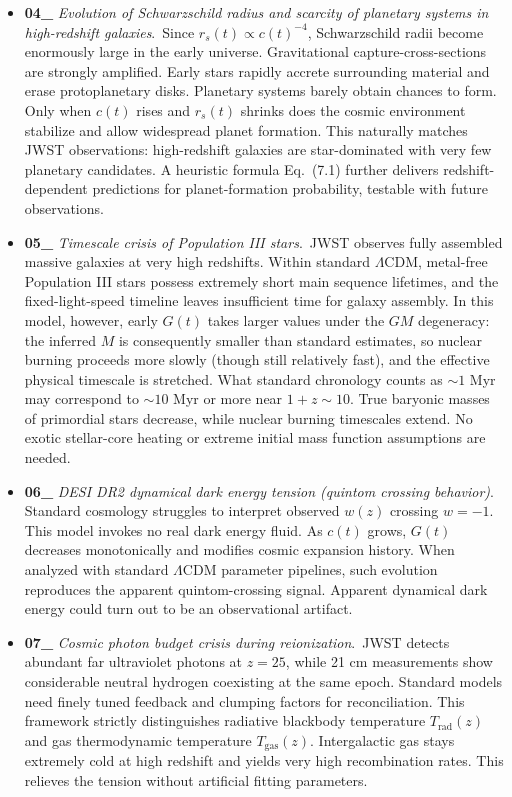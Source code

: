 \documentclass[12pt,leqno]{article}
\begin{document}
{\begin{itemize}
		\item \textbf{04\_} \textit{Evolution of Schwarzschild radius and scarcity of planetary systems in high-redshift galaxies}.\,\,\,Since $r_s(t)\propto c(t)^{-4}$, Schwarzschild radii become enormously large in the early universe. Gravitational capture-cross-sections are strongly amplified. Early stars rapidly accrete surrounding material and erase protoplanetary disks. Planetary systems barely obtain chances to form. Only when $c(t)$ rises and $r_s(t)$ shrinks does the cosmic environment stabilize and allow widespread planet formation. This naturally matches JWST observations: high-redshift galaxies are star-dominated with very few planetary candidates. A heuristic formula Eq.~(7.1) further delivers redshift-dependent predictions for planet-formation probability, testable with future observations.
		
		\item \textbf{05\_} \textit{Timescale crisis of Population III stars}.\,\,\,JWST observes fully assembled massive galaxies at very high redshifts. Within standard $\Lambda$CDM, metal-free Population III stars possess extremely short main sequence lifetimes, and the fixed-light-speed timeline leaves insufficient time for galaxy assembly. In this model, however, early $G(t)$ takes larger values under the $GM$ degeneracy: the inferred $M$ is consequently smaller than standard estimates, so nuclear burning proceeds more slowly (though still relatively fast), and the effective physical timescale is stretched. What standard chronology counts as $\sim 1$ Myr may correspond to $\sim 10$ Myr or more near $1+z \sim 10$. True baryonic masses of primordial stars decrease, while nuclear burning timescales extend. No exotic stellar-core heating or extreme initial mass function assumptions are needed.
				
		\item \textbf{06\_} \textit{DESI DR2 dynamical dark energy tension (quintom crossing behavior)}.\,\,\,Standard cosmology struggles to interpret observed $w(z)$ crossing $w=-1$. This model invokes no real dark energy fluid. As $c(t)$ grows, $G(t)$ decreases monotonically and modifies cosmic expansion history. When analyzed with standard $\Lambda$CDM parameter pipelines, such evolution reproduces the apparent quintom-crossing signal. Apparent dynamical dark energy could turn out to be an observational artifact.
		
		\item \textbf{07\_} \textit{Cosmic photon budget crisis during reionization}.\,\,\,JWST detects abundant far ultraviolet photons at $z=25$, while 21 cm measurements show considerable neutral hydrogen coexisting at the same epoch. Standard models need finely tuned feedback and clumping factors for reconciliation. This framework strictly distinguishes radiative blackbody temperature $T_\mathrm{rad}(z)$ and gas thermodynamic temperature $T_\mathrm{gas}(z)$. Intergalactic gas stays extremely cold at high redshift and yields very high recombination rates. This relieves the tension without artificial fitting parameters.
		

\end{itemize}}
\end{document}

